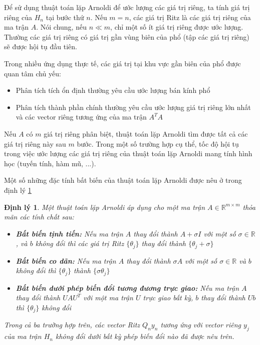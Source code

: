 \documentclass[14pt, a4paper]{article}
\numberwithin{equation}{section}
\numberwithin{algorithm}{section}
\numberwithin{figure}{section}
\newtheorem{dl}{Định lý}
\numberwithin{dl}{section}
\numberwithin{md}{section}
\numberwithin{bd}{section}
\numberwithin{dn}{section}
\begin{document}
Để sử dụng thuật toán lặp Arnoldi để ước lượng các giá trị riêng, ta tính giá trị riêng của $H_n$ tại bước thứ $n$. Nếu $m=n$, các giá trị Ritz là các giá trị riêng của ma trận $A$. Nói chung, nếu $n \ll m$, chỉ một số ít giá trị riêng được ước lượng. Thường các giá trị riêng có giá trị gần vùng biên của phổ (tập các giá trị riêng) sẽ được hội tụ đầu tiên.

Trong nhiều ứng dụng thực tế, các giá trị tại khu vực gần biên của phổ được quan tâm chủ yếu:

\begin{itemize}
    \item Phân tích tích ổn định thường yêu cầu ước lượng bán kính phổ
    \item Phân tích thành phần chính thường yêu cầu ước lượng giá trị riêng lớn nhất và các vector riêng tương ứng của ma trận $A^T A$
\end{itemize}

Nếu $A$ có $m$ giá trị riêng phân biệt, thuật toán lặp Arnoldi tìm được tất cả các giá trị riêng này sau $m$ bước. Trong một số trường hợp cụ thể, tốc độ hội tụ trong việc ước lượng các giá trị riêng của thuật toán lặp Arnoldi mang tính hình học (tuyến tính, hàm mũ, ...).

Một số những đặc tính bất biến của thuật toán lặp Arnoldi được nêu ở trong định lý \ref{dl:Arnoldi_Properties}

\begin{dl} \label{dl:Arnoldi_Properties}
    Một thuật toán lặp Arnoldi áp dụng cho một ma trận $A \in \mathbb{R}^{m \times m}$ thỏa mãn các tính chất sau:
    \begin{itemize}
        \item \textbf{Bất biến tịnh tiến:} Nếu ma trận $A$ thay đổi thành $A + \sigma I $ với một số $\sigma \in \mathbb{R}$, và $b$ không đổi thì các giá trị Ritz $\lbrace \theta_j \rbrace$ thay đổi thành $\lbrace \theta_j + \sigma \rbrace$
        \item \textbf{Bất biến co dãn:} Nếu ma trận $A$ thay đổi thành $\sigma A$ với một số $\sigma \in \mathbb{R}$ và $b$ không đổi thì $\lbrace \theta_j \rbrace$ thành $\lbrace \sigma \theta_j \rbrace$
        \item \textbf{Bất biến dưới phép biến đổi tương đương trực giao:} Nếu ma trận $A$ thay đổi thành $UAU^T$ với một ma trận $U$ trực giao bất kỳ, $b$ thay đổi thành $Ub$ thì $\lbrace \theta_j \rbrace$ không đổi
    \end{itemize}
    Trong cả ba trường hợp trên, các vector Ritz $Q_n y_n$ tương ứng với vector riêng $y_j$ của ma trận $H_n$ không đổi dưới bất kỳ phép biến đổi nào đã được nêu trên.
\end{dl}
\end{document}
